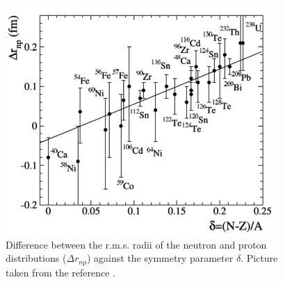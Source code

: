 \begin{figure}[H]
\begin{center}
\includegraphics[scale=0.6]{pictures/png/antiproton.png}
\caption{Difference between the r.m.s. radii of the neutron and proton distributions ($\Delta r_{np}$) against the symmetry parameter $\delta$. Picture taken from the reference \cite{trzcina}.}
\label{antiproton}
\end{center}
\end{figure}




